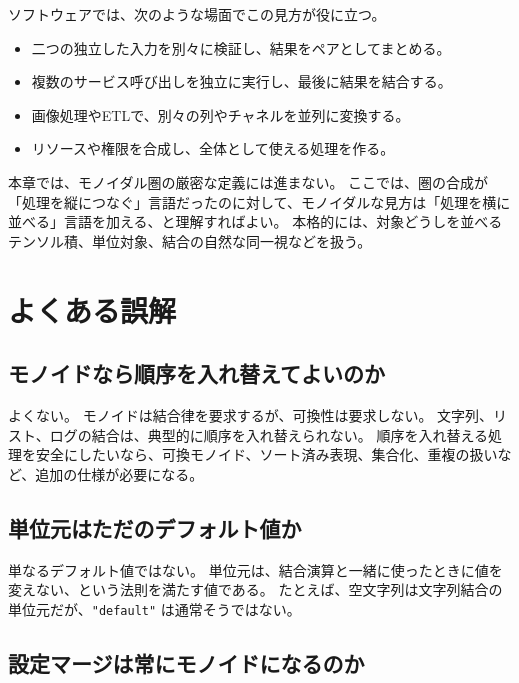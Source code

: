 ソフトウェアでは、次のような場面でこの見方が役に立つ。

\begin{itemize}
\item 二つの独立した入力を別々に検証し、結果をペアとしてまとめる。
\item 複数のサービス呼び出しを独立に実行し、最後に結果を結合する。
\item 画像処理やETLで、別々の列やチャネルを並列に変換する。
\item リソースや権限を合成し、全体として使える処理を作る。
\end{itemize}


本章では、モノイダル圏の厳密な定義には進まない。
ここでは、圏の合成が「処理を縦につなぐ」言語だったのに対して、モノイダルな見方は「処理を横に並べる」言語を加える、と理解すればよい。
本格的には、対象どうしを並べるテンソル積、単位対象、結合の自然な同一視などを扱う。

\section{よくある誤解}

\subsection{モノイドなら順序を入れ替えてよいのか}

よくない。
モノイドは結合律を要求するが、可換性は要求しない。
文字列、リスト、ログの結合は、典型的に順序を入れ替えられない。
順序を入れ替える処理を安全にしたいなら、可換モノイド、ソート済み表現、集合化、重複の扱いなど、追加の仕様が必要になる。

\subsection{単位元はただのデフォルト値か}

単なるデフォルト値ではない。
単位元は、結合演算と一緒に使ったときに値を変えない、という法則を満たす値である。
たとえば、空文字列は文字列結合の単位元だが、\texttt{"default"} は通常そうではない。

\subsection{設定マージは常にモノイドになるのか}

